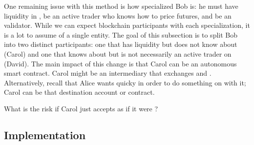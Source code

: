 One remaining issue with this method is how specialized Bob is: he must have liquidity in \ethone, be an active trader who knows how to price futures, and be an \layertwo validator. While we can expect blockchain participants with each specialization, it is a lot to assume of a single entity. The goal of this subsection is to split Bob into two distinct participants: one that has \ethone liquidity but does not know about \layertwo (Carol) and one that knows about \layertwo but is not necessarily an active trader on \layerone (David). The main impact of this change is that Carol can be an autonomous \layerone smart contract. Carol might be an intermediary that exchanges \ethxx and \ethone. Alternatively, recall that Alice wants \ethone quicky in order to do something on \layerone with it; Carol can be that destination account or contract.

What is the risk if Carol just accepts \ethxx as if it were \ethone? 

\subsection{Implementation} 

